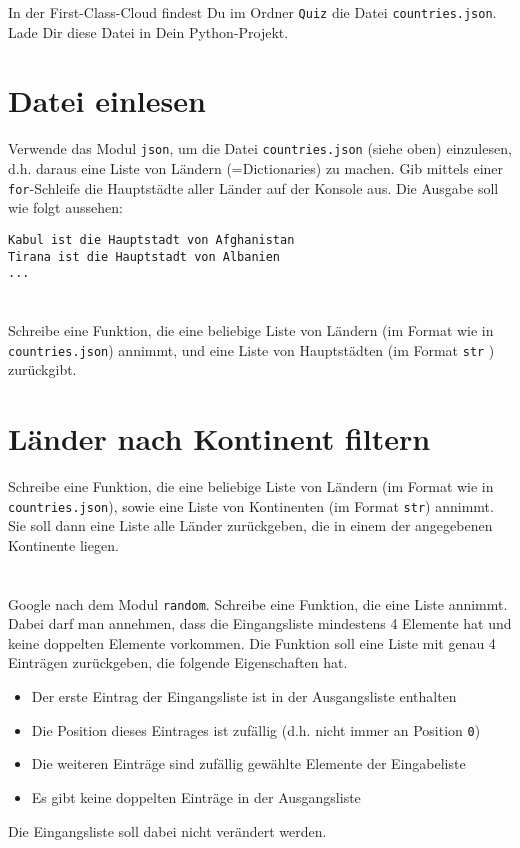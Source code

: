 \documentclass[a4paper]{article}
\newcommand{\pybw}[1]{\texttt{#1}}
\begin{document}




In der First-Class-Cloud findest Du im Ordner \texttt{Quiz} die Datei \texttt{countries.json}. Lade Dir diese Datei in Dein Python-Projekt. 

\section{Datei einlesen}
Verwende das Modul \texttt{json}, um die Datei \texttt{countries.json} (siehe oben) einzulesen, d.h. daraus eine Liste von Ländern (=Dictionaries) zu machen. Gib mittels einer \pybw{for}-Schleife die Hauptstädte aller Länder auf der Konsole aus. Die Ausgabe soll wie folgt aussehen: 
\begin{verbatim}
Kabul ist die Hauptstadt von Afghanistan
Tirana ist die Hauptstadt von Albanien
...
\end{verbatim}


\section{}
Schreibe eine Funktion, die eine beliebige Liste von Ländern (im Format wie in \texttt{countries.json}) annimmt, und eine Liste von Hauptstädten (im Format \pybw{str} ) zurückgibt. 

\section{Länder nach Kontinent filtern}
Schreibe eine Funktion, die eine beliebige Liste von Ländern (im Format wie in \texttt{countries.json}), sowie eine Liste von Kontinenten (im Format \pybw{str}) annimmt. Sie soll dann eine Liste alle Länder zurückgeben, die in einem der angegebenen Kontinente liegen. 

\section{}
Google nach dem Modul \texttt{random}. Schreibe eine Funktion, die eine Liste annimmt. Dabei darf man annehmen, dass die Eingangsliste mindestens 4 Elemente hat und keine doppelten Elemente vorkommen. Die Funktion soll eine Liste mit genau 4 Einträgen zurückgeben, die folgende Eigenschaften hat. 
\begin{itemize}
	\item Der erste Eintrag der Eingangsliste ist in der Ausgangsliste enthalten
	\item Die Position dieses Eintrages ist zufällig (d.h. nicht immer an Position \pybw{0})
	\item Die weiteren Einträge sind zufällig gewählte Elemente der Eingabeliste
	\item Es gibt keine doppelten Einträge in der Ausgangsliste
\end{itemize}
Die Eingangsliste soll dabei nicht verändert werden. 
\end{document}
